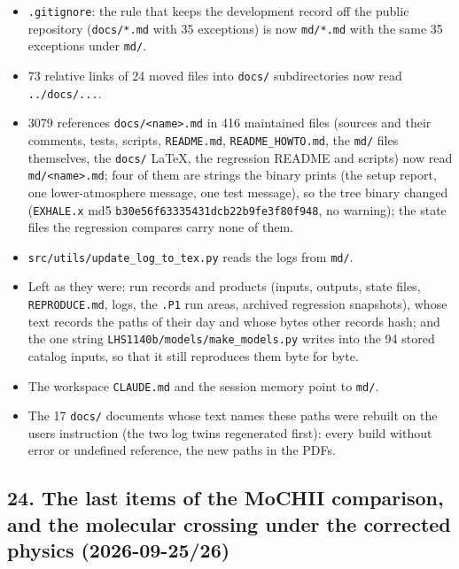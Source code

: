 \documentclass[english,a4paper]{my_memo}
\providecommand{\tightlist}{\setlength{\itemsep}{0pt}\setlength{\parskip}{0pt}}
\begin{document}
\begin{itemize}
\tightlist
\item
  \texttt{.gitignore}: the rule that keeps the development record off the public
  repository (\texttt{docs/*.md} with 35 exceptions) is now \texttt{md/*.md} with the same
  35 exceptions under \texttt{md/}.
\item
  73 relative links of 24 moved files into \texttt{docs/} subdirectories now read
  \texttt{../docs/...}.
\item
  3079 references \texttt{docs/\textless{}name\textgreater{}.md} in 416 maintained files (sources and
  their comments, tests, scripts, \texttt{README.md}, \texttt{README\_HOWTO.md}, the \texttt{md/}
  files themselves, the \texttt{docs/} LaTeX, the regression README and scripts) now
  read \texttt{md/\textless{}name\textgreater{}.md}; four of them are strings the binary prints (the setup
  report, one lower-atmosphere message, one test message), so the tree binary
  changed (\texttt{EXHALE.x} md5 \texttt{b30e56f63335431dcb22b9fe3f80f948}, no warning); the
  state files the regression compares carry none of them.
\item
  \texttt{src/utils/update\_log\_to\_tex.py} reads the logs from \texttt{md/}.
\item
  Left as they were: run records and products (inputs, outputs, state files,
  \texttt{REPRODUCE.md}, logs, the \texttt{.P1} run areas, archived regression snapshots),
  whose text records the paths of their day and whose bytes other records
  hash; and the one string \texttt{LHS1140b/models/make\_models.py} writes into the 94
  stored catalog inputs, so that it still reproduces them byte for byte.
\item
  The workspace \texttt{CLAUDE.md} and the session memory point to \texttt{md/}.
\item
  The 17 \texttt{docs/} documents whose text names these paths were rebuilt on the
  user\textquotesingle s instruction (the two log twins regenerated first): every build
  without error or undefined reference, the new paths in the PDFs.
\end{itemize}

\subsection{24. The last items of the MoCHII comparison, and the molecular crossing under the corrected physics (2026-09-25/26)}\label{24-the-last-items-of-the-mochii-comparison-and-the-molecular-crossing-under-the-corrected-physics-2026-09-2526}
\end{document}
